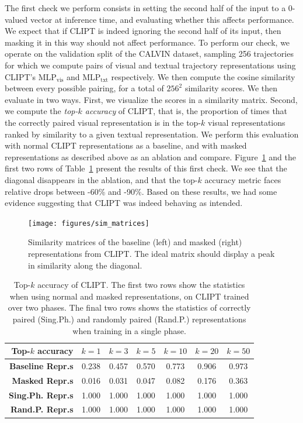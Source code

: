 \documentclass[../main.tex]{subfiles}
\begin{document}
The first check we perform consists in setting the second half of the input to a 0-valued vector at
inference time, and evaluating whether this affects performance. We expect that if CLIPT is indeed
ignoring the second half of its input, then masking it in this way should not affect performance. To
perform our check, we operate on the validation split of the CALVIN dataset, sampling 256
trajectories for which we compute pairs of visual and textual trajectory representations using
CLIPT's $\text{MLP}_\text{vis}$ and $\text{MLP}_\text{txt}$ respectively. We then compute the cosine
similarity between every possible pairing, for a total of $256^2$ similarity scores. We then
evaluate in two ways. First, we visualize the scores in a similarity matrix. Second, we compute the
\emph{top-$k$ accuracy} of CLIPT, that is, the proportion of times that the correctly paired visual
representation is in the top-$k$ visual representations ranked by similarity to a given textual
representation. We perform this evaluation with normal CLIPT representations as a baseline, and with
masked representations as described above as an ablation and compare. Figure~\ref{fig:clipt-masked}
and the first two rows of Table~\ref{tab:clipt-eval} present the results of this first check. We see
that the diagonal disappears in the ablation, and that the top-$k$ accuracy metric faces relative
drops between -60\% and -90\%. Based on these results, we had some evidence suggesting that CLIPT
was indeed behaving as intended.

\begin{figure}[t]
	\centering
	\texttt{[image: figures/sim\_matrices]}
	\caption[Similarity matrices of baseline and masked CLIPT]{Similarity matrices of the baseline
		(left) and masked (right) representations from CLIPT. The ideal matrix should display a peak in
		similarity along the diagonal.}
	\label{fig:clipt-masked}
\end{figure}

\begin{table}[t]
	\centering
	\caption[Top-$k$ accuracy of CLIPT]{Top-$k$ accuracy of CLIPT. The first two rows show the
		statistics when using normal and masked representations, on CLIPT trained over two phases. The
		final two rows shows the statistics of correctly paired (Sing.Ph.) and randomly paired (Rand.P.)
		representations when training in a single phase.}
	\label{tab:clipt-eval}
	\begin{tabular}{@{}rcccccc@{}}
		\toprule[1.5pt]
		\textbf{Top-$k$ accuracy} & $k=1$ & $k=3$ & $k=5$ & $k=10$ & $k=20$ & $k=50$ \\ \midrule
		\textbf{Baseline Repr.s}  & 0.238 & 0.457 & 0.570 & 0.773  & 0.906  & 0.973  \\
		\textbf{Masked Repr.s}    & 0.016 & 0.031 & 0.047 & 0.082  & 0.176  & 0.363  \\ \midrule
		\textbf{Sing.Ph. Repr.s}  & 1.000 & 1.000 & 1.000 & 1.000  & 1.000  & 1.000  \\
		\textbf{Rand.P. Repr.s}   & 1.000 & 1.000 & 1.000 & 1.000  & 1.000  & 1.000  \\
		\bottomrule[1.5pt]
	\end{tabular}
\end{table}
\end{document}
